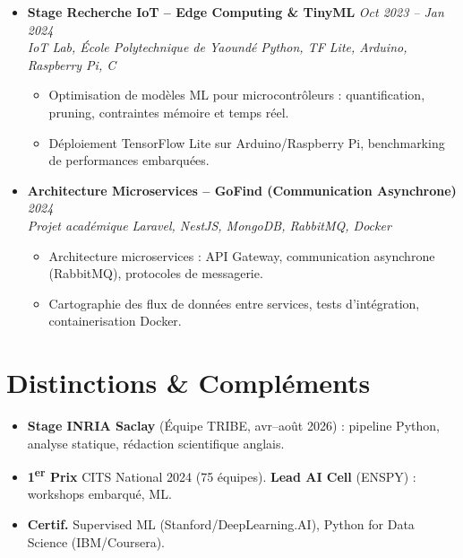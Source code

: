 \documentclass[a4paper,11pt]{article}
\begin{document}
\begin{itemize}[leftmargin=*, label={-}]
\item \textbf{Stage Recherche IoT -- Edge Computing \& TinyML} \hfill \textit{Oct 2023 -- Jan 2024} \\
\textit{IoT Lab, École Polytechnique de Yaoundé} \hfill \textit{Python, TF Lite, Arduino, Raspberry Pi, C}
\vspace{-2pt}
    \begin{itemize}[leftmargin=0.4cm, nosep, label=\tiny$\bullet$]
        \item \small{Optimisation de modèles ML pour microcontrôleurs : quantification, pruning, contraintes mémoire et temps réel.}
        \item \small{Déploiement TensorFlow Lite sur Arduino/Raspberry Pi, benchmarking de performances embarquées.}
    \end{itemize}
\vspace{3pt}

\item \textbf{Architecture Microservices -- GoFind (Communication Asynchrone)} \hfill \textit{2024} \\
\textit{Projet académique} \hfill \textit{Laravel, NestJS, MongoDB, RabbitMQ, Docker}
\vspace{-2pt}
    \begin{itemize}[leftmargin=0.4cm, nosep, label=\tiny$\bullet$]
        \item \small{Architecture microservices : API Gateway, communication asynchrone (RabbitMQ), protocoles de messagerie.}
        \item \small{Cartographie des flux de données entre services, tests d'intégration, containerisation Docker.}
    \end{itemize}
\vspace{3pt}

\end{itemize}

\section{Distinctions \& Compléments}
\begin{itemize}[leftmargin=*, label=\tiny$\bullet$, nosep]
    \item \small{\textbf{Stage INRIA Saclay} (Équipe TRIBE, avr--août 2026) : pipeline Python, analyse statique, rédaction scientifique anglais.}
    \item \small{\textbf{1\textsuperscript{er} Prix} CITS National 2024 (75 équipes). \textbf{Lead AI Cell} (ENSPY) : workshops embarqué, ML.}
    \item \small{\textbf{Certif.} Supervised ML (Stanford/DeepLearning.AI), Python for Data Science (IBM/Coursera).}
\end{itemize}
\end{document}
